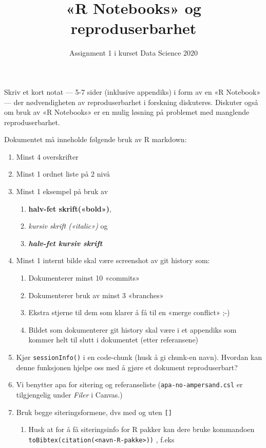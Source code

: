 \documentclass[
  12pt,
  norsk,
]{article}
\title{«R Notebooks» og reproduserbarhet}
\author{Assignment 1 i kurset Data Science 2020}
\date{}
\providecommand{\tightlist}{%
  \setlength{\itemsep}{0pt}\setlength{\parskip}{0pt}}
\begin{document}
\maketitle

Skriv et kort notat --- 5-7 sider (inklusive appendiks) i form av en «R
Notebook» --- der nødvendigheten av reproduserbarhet i forskning
diskuteres. Diskuter også om bruk av «R Notebooks» er en mulig løsning
på problemet med manglende reproduserbarhet.

Dokumentet må inneholde følgende bruk av R markdown:

\begin{enumerate}
\def\labelenumi{\arabic{enumi})}
\tightlist
\item
  Minst 4 overskrifter
\item
  Minst 1 ordnet liste på 2 nivå
\item
  Minst 1 eksempel på bruk av

  \begin{enumerate}
  \def\labelenumii{\arabic{enumii})}
  \tightlist
  \item
    \textbf{halv-fet skrift(«bold»)},
  \item
    \emph{kursiv skrift («italic»)} og
  \item
    \textbf{\emph{halv-fet kursiv skrift}}
  \end{enumerate}
\item
  Minst 1 internt bilde skal være screenshot av git history som:

  \begin{enumerate}
  \def\labelenumii{\arabic{enumii})}
  \tightlist
  \item
    Dokumenterer minst 10 «commits»
  \item
    Dokumenterer bruk av minst 3 «branches»
  \item
    Ekstra stjerne til dem som klarer å få til en «merge conflict» ;-)
  \item
    Bildet som dokumenterer git history skal være i et appendiks som
    kommer helt til slutt i dokumentet (etter referansene)
  \end{enumerate}
\item
  Kjør \texttt{sessionInfo()} i en code-chunk (husk å gi chunk-en navn).
  Hvordan kan denne funksjonen hjelpe oss med å gjøre et dokument
  reproduserbart?
\item
  Vi benytter apa for sitering og referanseliste
  (\texttt{apa-no-ampersand.csl} er tilgjengelig under \emph{Filer} i
  Canvas.)
\item
  Bruk begge siteringsformene, dvs med og uten \texttt{{[}{]}}

  \begin{enumerate}
  \def\labelenumii{\arabic{enumii})}
  \tightlist
  \item
    Husk at for å få siteringsinfo for R pakker kan dere bruke
    kommandoen
    \texttt{toBibtex(citation(\textless{}navn-R-pakke\textgreater{}))} ,
    f.eks
  \end{enumerate}
\end{enumerate}
\end{document}

